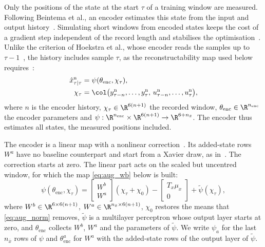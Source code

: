 Only the positions of the state at the start $\tau$ of a training window are
measured.
Following Beintema et al., an encoder estimates this state from the input and
output history~\cite{beintema2023subnet}.
Simulating short windows from encoded states keeps the cost of a gradient step
independent of the record length and stabilises the
optimisation~\cite[Secs.~2, 3]{beintema2023subnet}.
Unlike the criterion of Hoekstra et al., whose encoder reads the samples up to
$\tau-1$~\cite[Eq.~(22e)]{hoekstra2026lfr}, the history includes sample
$\tau$, as the reconstructability map used below
requires~\cite[Eqs.~(11) to (17)]{hoekstra2026encoder}:
\begin{equation}
\begin{aligned}
 \hat x^{\mathrm n}_{\tau|\tau}
 &=\psi(\theta_{\mathrm{enc}},\chi_\tau),\\
 \chi_\tau&=\col\bigl(y^{\mathrm n}_{\tau-n},\dots,y^{\mathrm n}_\tau,\,
   u^{\mathrm n}_{\tau-n},\dots,u^{\mathrm n}_\tau\bigr),
\end{aligned}
 \label{eq:aug_encoder}
\end{equation}
where $n$ is the encoder history, $\chi_\tau\in\R^{6(n+1)}$ the recorded
window, $\theta_{\mathrm{enc}}\in\R^{n_{\mathrm{enc}}}$ the encoder parameters
and $\psi:\R^{n_{\mathrm{enc}}}\times\R^{6(n+1)}\to\R^{6+n_{\bar x}}$.
The encoder thus estimates all states, the measured positions included.

The encoder is a linear map with a nonlinear
correction~\cite[Eq.~(8)]{hoekstra2026encoder}.
Its added-state rows $W^a$ have no baseline counterpart and start from a
Xavier draw, as in~\cite[Eq.~(31)]{hoekstra2026lfr}.
The correction starts at zero.
The linear part acts on the scaled but uncentred window, for which the map
\eqref{eq:aug_wb} below is built:
\begin{equation}
 \psi(\theta_{\mathrm{enc}},\chi_\tau)
 =\begin{bmatrix}W^b\\ W^a\end{bmatrix}(\chi_\tau+\chi_0)
  -\begin{bmatrix}T_x\mu_x\\ 0\end{bmatrix}
  +\tilde\psi(\chi_\tau),
 \label{eq:aug_enc_lin}
\end{equation}
where $W^b\in\R^{6\times6(n+1)}$, $W^a\in\R^{n_{\bar x}\times6(n+1)}$,
$\chi_0$ restores the means that \eqref{eq:aug_norm} removes, $\tilde\psi$ is
a multilayer perceptron whose output layer starts at zero, and
$\theta_{\mathrm{enc}}$ collects $W^b$, $W^a$ and the parameters of
$\tilde\psi$.
We write $\psi_a$ for the last $n_{\bar x}$ rows of $\psi$ and
$\theta^a_{\mathrm{enc}}$ for $W^a$ with the added-state rows of the output
layer of $\tilde\psi$.

